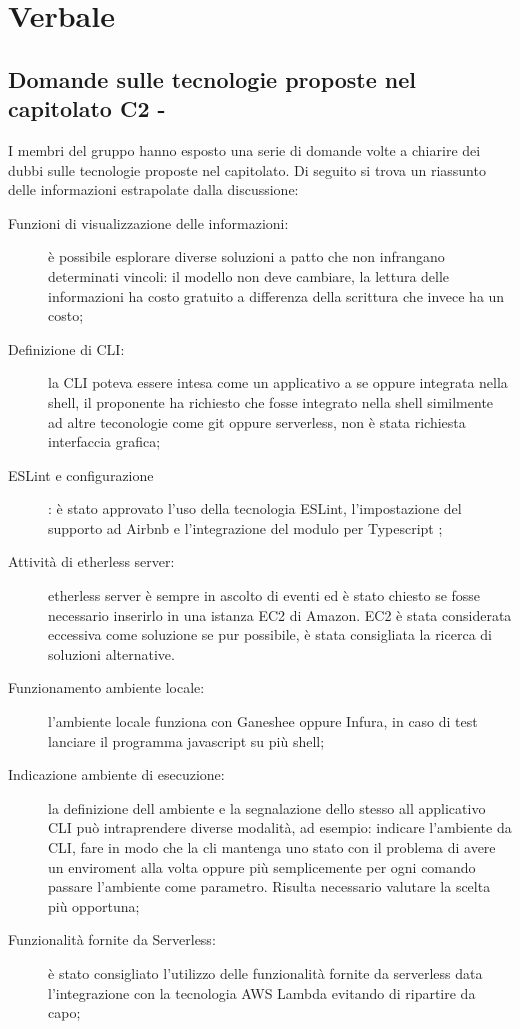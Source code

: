 \section{Verbale}
\subsection{Domande sulle tecnologie proposte nel capitolato C2 - \NomeProgetto}
I membri del gruppo hanno esposto una serie di domande volte a chiarire dei dubbi sulle tecnologie proposte nel capitolato.
Di seguito si trova un riassunto delle informazioni estrapolate dalla discussione:
\begin{description}
	\item[Funzioni di visualizzazione delle informazioni:] è possibile esplorare diverse soluzioni a patto che non infrangano determinati vincoli: il modello non deve cambiare, la lettura delle informazioni ha costo gratuito a differenza della scrittura che invece ha un costo;
	\item[Definizione di CLI:] la CLI poteva essere intesa come un applicativo a se oppure integrata nella shell, il proponente ha richiesto che fosse integrato nella shell similmente ad altre teconologie come git oppure serverless, non è stata richiesta interfaccia grafica;
	\item[ESLint e configurazione]: è stato approvato l'uso della tecnologia ESLint, l'impostazione del supporto ad Airbnb e l'integrazione del modulo per Typescript ;
	\item[Attività di etherless server:] etherless server è sempre in ascolto di eventi ed è stato chiesto se fosse necessario inserirlo in una istanza EC2 di Amazon. EC2 è stata considerata eccessiva come soluzione se pur possibile, è stata consigliata la ricerca di soluzioni alternative. 
	\item[Funzionamento ambiente locale: ] l'ambiente locale funziona con Ganeshee oppure Infura, in caso di test lanciare il programma javascript su più shell;
	\item[Indicazione ambiente di esecuzione:] la definizione dell ambiente e la segnalazione dello stesso all applicativo CLI può intraprendere diverse modalità, ad esempio: indicare l'ambiente da CLI, fare in modo che la cli mantenga uno stato con il problema di avere un enviroment alla volta oppure più semplicemente per ogni comando passare l'ambiente come parametro. Risulta necessario valutare la scelta più opportuna;	
	\item[Funzionalità fornite da Serverless:] è stato consigliato l'utilizzo delle funzionalità fornite da serverless data l'integrazione con la tecnologia AWS Lambda evitando di ripartire da capo;

\end{description}
